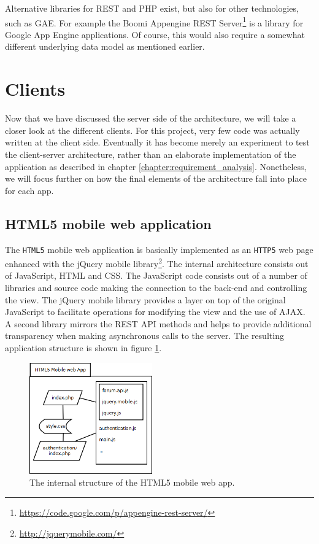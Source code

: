 Alternative libraries for REST and PHP exist, but also for other technologies, such as GAE. For example the Boomi Appengine REST Server\footnote{\url{https://code.google.com/p/appengine-rest-server/}} is a library for Google App Engine applications. Of course, this would also require a somewhat different underlying data model as mentioned earlier.


\section{Clients}

Now that we have discussed the server side of the architecture, we will take a closer look at the different clients. For this project, very few code was actually written at the client side. Eventually it has become merely an experiment to test the client-server architecture, rather than an elaborate implementation of the application as described in chapter \ref{chapter:requirement_analysis}. Nonetheless, we will focus further on how the final elements of the architecture fall into place for each app.


\subsection{HTML5 mobile web application}

The \texttt{HTML5} mobile web application is basically implemented as an \texttt{HTTP5} web page enhanced with the jQuery mobile library\footnote{\url{http://jquerymobile.com/}}. The internal architecture consists out of JavaScript, HTML and CSS. The JavaScript code consists out of a number of libraries and source code making the connection to the back-end and controlling the view. The jQuery mobile library provides a layer on top of the original JavaScript to facilitate operations for modifying the view and the use of AJAX. A second library mirrors the REST API methods and helps to provide additional transparency when making asynchronous calls to the server. The resulting application structure is shown in figure \ref{figure:html5:architecture}.

\begin{figure}
	\begin{center}
		\includegraphics[width=200px]{img/html5_architecture}
		\caption{The internal structure of the HTML5 mobile web app.}
		\label{figure:html5:architecture}
	\end{center}
\end{figure}


